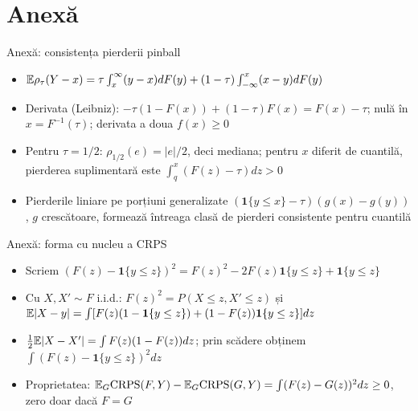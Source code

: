 \section{Anexă}

\begin{frame}{Anexă: consistența pierderii pinball}
\hypertarget{atsapp1}{}
\itemsize{\small}
\begin{itemize}
    \item $\mathbb{E}\rho_\tau(Y - x) = \tau\int_x^\infty(y - x)dF(y) + (1 - \tau)\int_{-\infty}^x(x - y)dF(y)$
    \item Derivata (Leibniz): $-\tau(1 - F(x)) + (1 - \tau)F(x) = F(x) - \tau$; nulă în $x = F^{-1}(\tau)$; derivata a doua $f(x) \ge 0$
    \item Pentru $\tau = 1/2$: $\rho_{1/2}(e) = |e|/2$, deci mediana; pentru $x$ diferit de cuantilă, pierderea suplimentară este $\int_q^x(F(z) - \tau)dz > 0$
    \item Pierderile liniare pe porțiuni generalizate $(\mathbf 1\{y \le x\} - \tau)(g(x) - g(y))$, $g$ crescătoare, formează întreaga clasă de pierderi consistente pentru cuantilă 
\end{itemize}
\end{frame}

\begin{frame}{Anexă: forma cu nucleu a CRPS}
\hypertarget{atsapp2}{}
\itemsize{\small}
\begin{itemize}
    \item Scriem $(F(z) - \mathbf 1\{y \le z\})^2 = F(z)^2 - 2F(z)\mathbf 1\{y \le z\} + \mathbf 1\{y \le z\}$
    \item Cu $X, X' \sim F$ i.i.d.: $F(z)^2 = P(X \le z, X' \le z)$ și $\mathbb{E}|X - y| = \int[F(z)(1 - \mathbf 1\{y \le z\}) + (1 - F(z))\mathbf 1\{y \le z\}]dz$
    \item $\frac12\mathbb{E}|X - X'| = \int F(z)(1 - F(z))dz$; prin scădere obținem $\int(F(z) - \mathbf 1\{y \le z\})^2dz$
    \item Proprietatea: $\mathbb{E}_G\mathrm{CRPS}(F, Y) - \mathbb{E}_G\mathrm{CRPS}(G, Y) = \int(F(z) - G(z))^2dz \ge 0$, zero doar dacă $F = G$
\end{itemize}
\end{frame}

